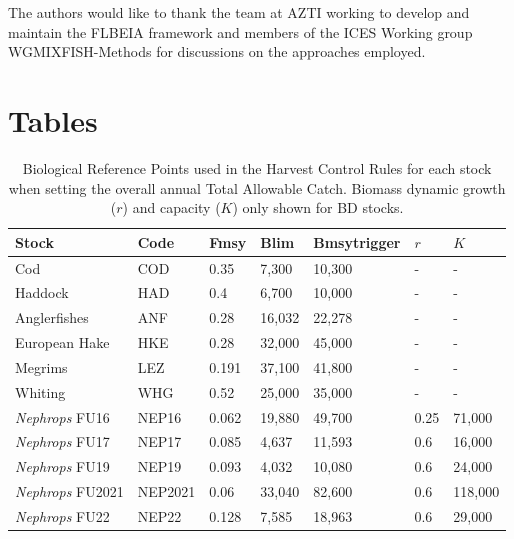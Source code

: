 \documentclass[12pt, halfline, a4paper]{ouparticle}
\begin{document}
\begin{notes}[Acknowledgements] The authors would like to thank the team at
	AZTI working to develop and
maintain the FLBEIA framework and members of the ICES Working group
WGMIXFISH-Methods for discussions on the approaches employed.
\end{notes}




\clearpage

\section{Tables}

\begin{table}[!ht]
	\center
	\begin{tabular}{p{3.2cm} p{2cm} p{2cm} p{2cm} p{2cm} p{1cm} p{1cm}}
		\toprule
		Stock & Code & Fmsy & Blim & Bmsytrigger & $r$ & $K$ \\
		\hline
		Cod & COD & 0.35 & 7,300  & 10,300 & - & - \\
		Haddock & HAD & 0.4 & 6,700 & 10,000 & - & -  \\
		Anglerfishes & ANF & 0.28 & 16,032 & 22,278 & - & -  \\
		European Hake & HKE & 0.28 & 32,000 & 45,000 & - & -  \\
		Megrims & LEZ & 0.191 & 37,100 & 41,800 & - & -  \\
		Whiting & WHG & 0.52 & 25,000 & 35,000 & - & -   \\
		\textit{Nephrops} FU16 & NEP16 & 0.062 & 19,880 & 49,700 & 0.25
		& 71,000  \\
		\textit{Nephrops} FU17 & NEP17 & 0.085 & 4,637 & 11,593 & 0.6 &
		16,000 \\
	        \textit{Nephrops} FU19 & NEP19 & 0.093 & 4,032 & 10,080 & 0.6 &
		24,000 \\
		\textit{Nephrops} FU2021 & NEP2021 & 0.06 & 33,040 & 82,600 &
		0.6 & 118,000 \\
		\textit{Nephrops} FU22 & NEP22 & 0.128 & 7,585 & 18,963 & 0.6 &
		29,000 \\
		\bottomrule
	\end{tabular}
	\label{tab:brp}
	\caption{Biological Reference Points used in the Harvest Control Rules
		for each stock when setting the overall annual Total Allowable
		Catch.  Biomass dynamic growth ($r$) and capacity ($K$) only
		shown for BD stocks.}
\end{table}

\clearpage
\end{document}
